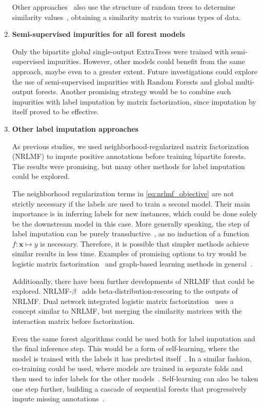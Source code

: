 \begin{enumerate}
    Other approaches~\cite{adiyeke2022semisupervised} also use the structure of random trees to determine similarity values~\cite{liu2008isolation}, obtaining a similarity matrix to various types of data.

    \item \textbf{Semi-supervised impurities for all forest models}

    Only the bipartite global single-output ExtraTrees were trained with semi-supervised impurities. However, other models could benefit from the same approach, maybe even to a greater extent. Future investigations could explore the use of semi-supervised impurities with Random Forests and global multi-output forests. Another promising strategy would be to combine such impurities with label imputation by matrix factorization, since imputation by itself proved to be effective.

    \item \textbf{Other label imputation approaches}

    As previous studies, we used neighborhood-regularized matrix factorization (NRLMF) to impute positive annotations before training bipartite forests. The results were promising, but many other methods for label imputation could be explored. 

    The neighborhood regularization terms in \autoref{eq:nrlmf_objective} are not strictly necessary if the labels are used to train a second model. Their main importance is in inferring labels for new instances, which could be done solely be the downstream model in this case.
    More generally speaking, the step of label imputation can be purely transductive~\cite{chapelle2006semisupervised,vanengelen2020survey}, as no induction of a function $f:\mathbf{x} \mapsto y$ is necessary.
    Therefore, it is possible that simpler methods achieve similar results in less time. Examples of promising options to try would be logistic matrix factorization~\cite{johnsonlogistic} and graph-based learning methods in general~\cite{chapelle2006semisupervised,vanengelen2020survey}.

    Additionally, there have been further developments of NRLMF that could be explored. NRLMF-$\beta$~\cite{ban2019nrlmf} adds beta-distribution-rescoring to the outputs of NRLMF. Dual network integrated logistic matrix factorization~\cite{hao2017predicting,li2019dnilmflda} uses a concept similar to NRLMF, but merging the similarity matrices with the interaction matrix before factorization.

    Even the same forest algorithms could be used both for label imputation and the final inference step. This would be a form of self-learning, where the model is trained with the labels it has predicted itself~\cite{vanengelen2020survey}. In a similar fashion, co-training could be used, where models are trained in separate folds and then used to infer labels for the other models~\cite{vanengelen2020survey}.
    Self-learning can also be taken one step further, building a cascade of sequential forests that progressively impute missing annotations~\cite{wang2020learning}.


\end{enumerate}
